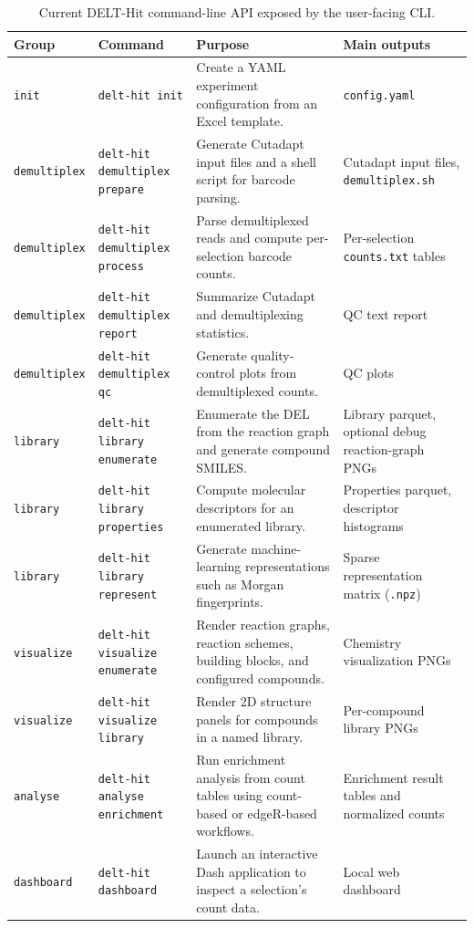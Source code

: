 \documentclass[pdflatex,sn-nature]{sn-jnl}
\begin{document}
\begin{table}
\centering
\small
\caption{Current DELT-Hit command-line API exposed by the user-facing CLI.}
\begin{tabular*}{\textheight}{@{\extracolsep\fill}p{2.2cm}p{2.8cm}p{6.4cm}p{3.8cm}}
\hline
\textbf{Group} & \textbf{Command} & \textbf{Purpose} & \textbf{Main outputs} \\
\hline
\texttt{init} & \texttt{delt-hit init} & Create a YAML experiment configuration from an Excel template. & \texttt{config.yaml} \\
\texttt{demultiplex} & \texttt{delt-hit demultiplex prepare} & Generate Cutadapt input files and a shell script for barcode parsing. & Cutadapt input files, \texttt{demultiplex.sh} \\
\texttt{demultiplex} & \texttt{delt-hit demultiplex process} & Parse demultiplexed reads and compute per-selection barcode counts. & Per-selection \texttt{counts.txt} tables \\
\texttt{demultiplex} & \texttt{delt-hit demultiplex report} & Summarize Cutadapt and demultiplexing statistics. & QC text report \\
\texttt{demultiplex} & \texttt{delt-hit demultiplex qc} & Generate quality-control plots from demultiplexed counts. & QC plots \\
\texttt{library} & \texttt{delt-hit library enumerate} & Enumerate the DEL from the reaction graph and generate compound SMILES. & Library parquet, optional debug reaction-graph PNGs \\
\texttt{library} & \texttt{delt-hit library properties} & Compute molecular descriptors for an enumerated library. & Properties parquet, descriptor histograms \\
\texttt{library} & \texttt{delt-hit library represent} & Generate machine-learning representations such as Morgan fingerprints. & Sparse representation matrix (\texttt{.npz}) \\
\texttt{visualize} & \texttt{delt-hit visualize enumerate} & Render reaction graphs, reaction schemes, building blocks, and configured compounds. & Chemistry visualization PNGs \\
\texttt{visualize} & \texttt{delt-hit visualize library} & Render 2D structure panels for compounds in a named library. & Per-compound library PNGs \\
\texttt{analyse} & \texttt{delt-hit analyse enrichment} & Run enrichment analysis from count tables using count-based or edgeR-based workflows. & Enrichment result tables and normalized counts \\
\texttt{dashboard} & \texttt{delt-hit dashboard} & Launch an interactive Dash application to inspect a selection's count data. & Local web dashboard \\
\hline
\end{tabular*}
\label{tab:delt-hit-api}
\end{table}
\end{document}
